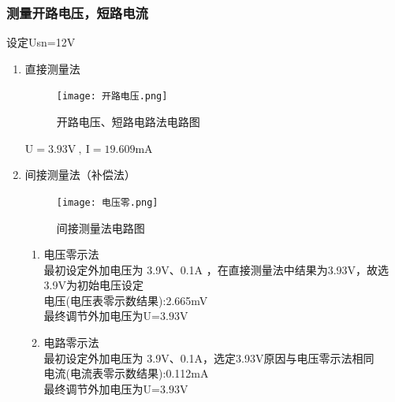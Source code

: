 \documentclass[dvipsnames, svgnames,a4paper,11pt]{article}
\begin{document}
	\subsubsection{测量开路电压，短路电流} 
	设定Usn=12V
	\begin{enumerate}
		\item
		直接测量法
		 \begin{figure}[H]
			\centering
			\texttt{[image: 开路电压.png]}
			\caption{开路电压、短路电路法电路图}
			\label{}
		  \end{figure}
		 $\mathrm{U=3.93V~,~I=19.609mA}$
		  \item 间接测量法（补偿法）
		 \begin{figure}[H]
			\centering
			\texttt{[image: 电压零.png]}
			\caption{间接测量法电路图}
			\label{}
		 \end{figure}
		 \begin{enumerate}
	     
		 \item 电压零示法\\
		 最初设定外加电压为 3.9V、0.1A  ，在直接测量法中结果为3.93V，故选3.9V为初始电压设定 \\电压(电压表零示数结果):2.665mV \\
		 最终调节外加电压为$\text{U=3.93V}$
		 
		 \item 电路零示法\\
		  最初设定外加电压为 3.9V、0.1A，选定3.93V原因与电压零示法相同  \\ 电流(电流表零示数结果):0.112mA\\
		 最终调节外加电压为$\text{U=3.93V}$
		 
		 \end{enumerate}	
		 
		 
	    
		
	\end{enumerate}	
\end{document}
